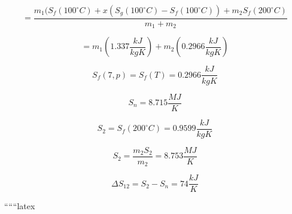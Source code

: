 \begin{equation*}
= \frac{m_{1} (S_{f}(100^{\circ}C) + x (S_{g}(100^{\circ}C) - S_{f}(100^{\circ}C)) + m_{2} S_{f}(200^{\circ}C)}{m_{1} + m_{2}}
\end{equation*}

\begin{equation*}
= m_{1} (1.337 \frac{kJ}{kgK}) + m_{2} (0.2966 \frac{kJ}{kgK})
\end{equation*}

\begin{equation*}
S_{f}(7, p) = S_{f}(T) = 0.2966 \frac{kJ}{kgK}
\end{equation*}

\begin{equation*}
S_{n} = 8.715 \frac{MJ}{K}
\end{equation*}

\begin{equation*}
S_{2} = S_{f}(200^{\circ}C) = 0.9599 \frac{kJ}{kgK}
\end{equation*}

\begin{equation*}
S_{2} = \frac{m_{2} S_{2}}{m_{2}} = 8.753 \frac{MJ}{K}
\end{equation*}

\begin{equation*}
\Delta S_{12} = S_{2} - S_{n} = 74 \frac{kJ}{K}
\end{equation*}

``````latex


